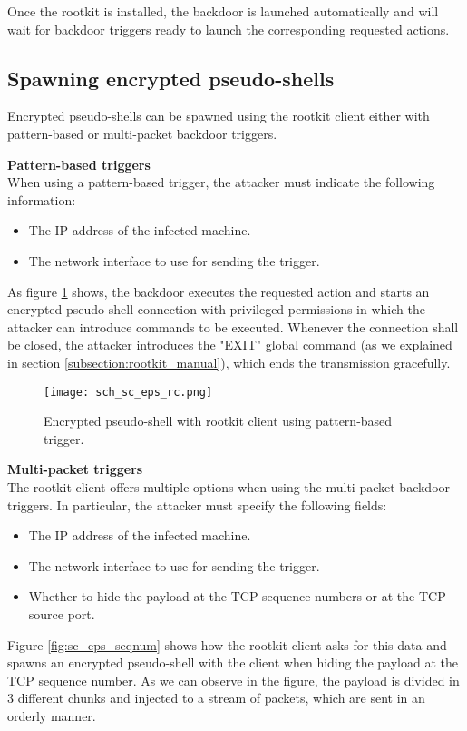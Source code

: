 Once the rootkit is installed, the backdoor is launched automatically and will wait for backdoor triggers ready to launch the corresponding requested actions.

\subsection{Spawning encrypted pseudo-shells}
Encrypted pseudo-shells can be spawned using the rootkit client either with pattern-based or multi-packet backdoor triggers.

\textbf{Pattern-based triggers}\\
When using a pattern-based trigger, the attacker must indicate the following information:
\begin{itemize}
\item The IP address of the infected machine.
\item The network interface to use for sending the trigger.
\end{itemize}

As figure \ref{fig:sc_eps_rc} shows, the backdoor executes the requested action and starts an encrypted pseudo-shell connection with privileged permissions in which the attacker can introduce commands to be executed. Whenever the connection shall be closed, the attacker introduces the "EXIT" global command (as we explained in section \ref{subsection:rootkit_manual}), which ends the transmission gracefully.

\begin{figure}[htbp]
	\centering
	\texttt{[image: sch\_sc\_eps\_rc.png]}
	\caption{Encrypted pseudo-shell with rootkit client using pattern-based trigger.}
	\label{fig:sc_eps_rc}
\end{figure}

\textbf{Multi-packet triggers}\\
The rootkit client offers multiple options when using the multi-packet backdoor triggers. In particular, the attacker must specify the following fields:
\begin{itemize}
\item The IP address of the infected machine.
\item The network interface to use for sending the trigger.
\item Whether to hide the payload at the TCP sequence numbers or at the TCP source port.
\end{itemize}

Figure \ref{fig:sc_eps_seqnum} shows how the rootkit client asks for this data and spawns an encrypted pseudo-shell with the client when hiding the payload at the TCP sequence number. As we can observe in the figure, the payload is divided in 3 different chunks and injected to a stream of packets, which are sent in an orderly manner.

